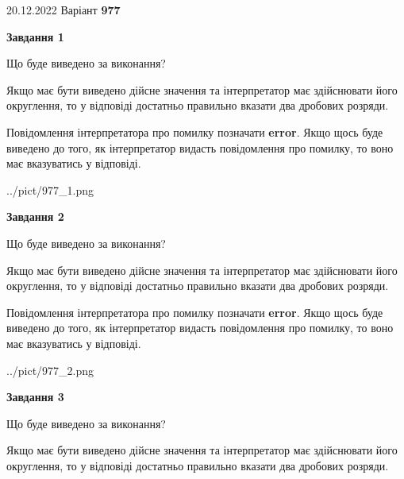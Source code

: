 \documentclass[12pt, ukrainian]{article}
\begin{document}
{20.12.2022 Варіант \No \textbf { 977 }\par}
{
\begin {Large}

{\begin {center}\textbf{Завдання 1}\end {center}}\par
Що буде виведено за виконання? \par

Якщо має бути виведено дійсне значення та інтерпретатор має здійснювати його округлення, 
то у відповіді достатньо правильно вказати два дробових розряди.

Повідомлення інтерпретатора про помилку позначати \textbf{error}.
Якщо щось буде виведено до того, як інтерпретатор видасть повідомлення про помилку, 
то воно має вказуватись у відповіді. \par

\begin{center}
	{../pict/977_1.png}
\end{center}
\newpage

{\begin {center}\textbf{Завдання 2}\end {center}}\par
Що буде виведено за виконання? \par

Якщо має бути виведено дійсне значення та інтерпретатор має здійснювати його округлення, 
то у відповіді достатньо правильно вказати два дробових розряди.

Повідомлення інтерпретатора про помилку позначати \textbf{error}.
Якщо щось буде виведено до того, як інтерпретатор видасть повідомлення про помилку, 
то воно має вказуватись у відповіді. \par

\begin{center}
	{../pict/977_2.png}
\end{center}
\newpage

{\begin {center}\textbf{Завдання 3}\end {center}}\par
Що буде виведено за виконання? \par

Якщо має бути виведено дійсне значення та інтерпретатор має здійснювати його округлення, 
то у відповіді достатньо правильно вказати два дробових розряди.


\end{Large}}
\end{document}
